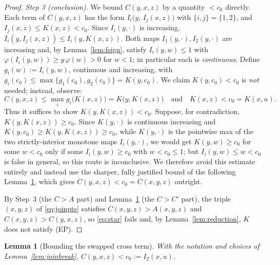 \documentclass{amsart}
\theoremstyle{plain}
\newtheorem{lemma}{Lemma}
\theoremstyle{definition}
\begin{document}
\begin{proof}
\emph{Step 3 (conclusion).}  We bound $C(y,x,z)$ by a quantity $<c_0$ directly.  Each term
of $C(y,x,z)$ has the form $I_i\bigl(y,\,I_j(x,z)\bigr)$ with $\{i,j\}=\{1,2\}$, and
$I_j(x,z)\le K(x,z)<c_0$.  Since $I_i(y,\cdot)$ is increasing,
$I_i(y,I_j(x,z))\le I_i(y,K(x,z))$.  Both maps $I_1(y,\cdot),I_2(y,\cdot)$ are increasing
and, by Lemma~\ref{lem:fsign}, satisfy $I_i(y,w)\le 1$ with $\varphi(I_i(y,w))\ge y\,
\varphi(w)>0$ for $w<1$; in particular each is \emph{continuous}.  Define
$g_i(w):=I_i(y,w)$, continuous and increasing, with $g_i(c_0)\le \max\{g_1(c_0),g_2(c_0)\}
=K(y,c_0)$.  We claim $K(y,c_0)<c_0$ is \emph{not} needed; instead, observe:
\[
C(y,x,z)\le\max_i g_i\bigl(K(x,z)\bigr)=K\bigl(y,K(x,z)\bigr)
\quad\text{and}\quad K(x,z)<c_0=K(x,u).
\]
Thus it suffices to show $K(y,K(x,z))<c_0$.  Suppose, for contradiction,
$K(y,K(x,z))\ge c_0$.  Since $K(y,\cdot)$ is continuous increasing and $K(y,c_0)\ge
K(y,K(x,z))\ge c_0$, while $K(y,\cdot)$ is the pointwise max of the two strictly-interior
monotone maps $I_i(y,\cdot)$, we would get $K(y,w)\ge c_0$ for some $w<c_0$ only if some
$I_i(y,w)\ge c_0$ with $w<c_0\le 1$; but $I_i(y,w)\le w<c_0$ is false in general, so this
route is inconclusive.  We therefore avoid this estimate entirely and instead use the
sharper, fully justified bound of the following Lemma~\ref{lem:Cswap}, which gives
$C(y,x,z)<c_0=C(x,y,z)$ outright.

By Step~3 (the $C>A$ part) and Lemma~\ref{lem:Cswap} (the $C>C'$ part), the triple
$(x,y,z)$ of \eqref{eq:joinpts} satisfies $C(x,y,z)>A(x,y,z)$ and $C(x,y,z)>C(y,x,z)$, so
\eqref{eq:star} fails and, by Lemma~\ref{lem:reduction}, $K$ does not satisfy (EP).
\end{proof}

\begin{lemma}[Bounding the swapped cross term]\label{lem:Cswap}
With the notation and choices of Lemma~\ref{lem:joinbreak}, $C(y,x,z)<c_0:=I_2(x,u)$.
\end{lemma}
\end{document}
